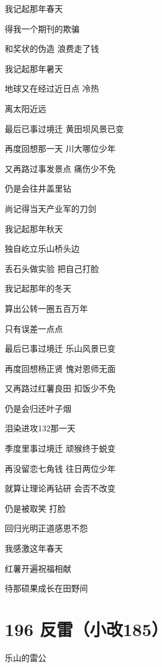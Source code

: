 \documentclass[UTF8,12pt,oneside]{ctexbook}
\begin{document}
        \begin{center}
        我记起那年春天
        
        得我一个期刊的欺骗
        
        和奖状的伪造 浪费走了钱
        
        我记起那年暑天
        
        地球又在经过近日点 冷热
        
        离太阳近远
        
        最后已事过境迁 黄田坝风景已变
        
        再度回想那一天 川大哪位少年
        
        又再路过事发景点 痛伤少不免
        
        仍是会往井盖里钻
        
        尚记得当天产业军的刀剑
        
        我记起那年秋天
        
        独自屹立乐山桥头边
        
        丢石头做实验 把自己打脸
        
        我记起那年的冬天
        
        算出公转一圈五百万年
        
        只有误差一点点
        
        最后已事过境迁 乐山风景已变
        
        再度回想杨正贤 愧对恩师无面
        
        又再路过红薯良田 扣饭少不免
        
        仍是会归还叶子烟
        
        泪染进攻132那一天
        
        季度里事过境迁 顽猴终于蜕变
        
        再没留恋七角钱 往日两位少年
        
        就算让理论再钻研 会否不改变
        
        仍是被取笑 打脸
        
        回归光明正道感恩不怨
        
        我感激这年春天
        
        红薯开遍祝福相献
        
        待那硕果成长在田野间
        \end{center}

        \section{196 反雷（小改185）}
        \begin{center}
            乐山的雷公
        \end{center}
        
\end{document}

